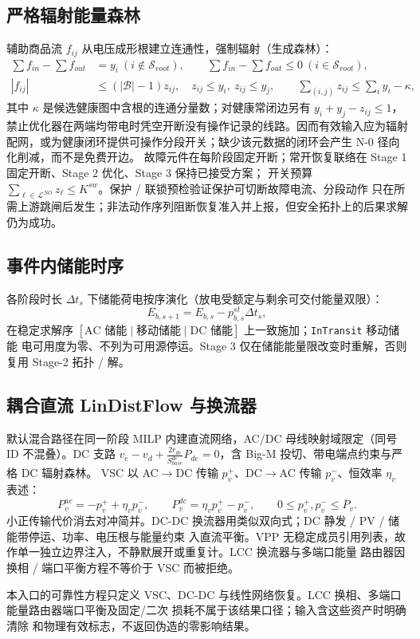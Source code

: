 \subsection{严格辐射能量森林}\label{sec:rel-rs-forest}
辅助商品流 $f_{ij}$ 从电压成形根建立连通性，强制辐射（生成森林）：
\begin{align}
 \sum f_{in}-\sum f_{out}&=y_i\ (i\notin\mathcal S_{root}),\qquad
 \sum f_{in}-\sum f_{out}\le0\ (i\in\mathcal S_{root}),\\
 |f_{ij}|&\le(|\mathcal B|-1)z_{ij},\quad z_{ij}\le y_i,\ z_{ij}\le y_j,\qquad
 \sum_{(i,j)}z_{ij}\le\sum_iy_i-\kappa,
\end{align}
其中 $\kappa$ 是候选健康图中含根的连通分量数；对健康常闭边另有
$y_i+y_j-z_{ij}\le1$，禁止优化器在两端均带电时凭空开断没有操作记录的线路。因而有效输入应为辐射
配网，或为健康闭环提供可操作分段开关；缺少该元数据的闭环会产生 N-0 径向化削减，而不是免费开边。
故障元件在每阶段固定开断；常开恢复联络在 Stage 1 固定开断、Stage 2 优化、Stage 3 保持已接受方案；
开关预算 $\sum_{\ell\in\mathcal L^{NO}}z_\ell\le K^{sw}$。保护 / 联锁预检验证保护可切断故障电流、分段动作
只在所需上游跳闸后发生；非法动作序列阻断恢复准入并上报，但安全拓扑上的后果求解仍为成功。

\subsection{事件内储能时序}\label{sec:rel-rs-storage}
各阶段时长 $\Delta t_s$ 下储能荷电按序演化（放电受额定与剩余可交付能量双限）：
\begin{equation}
 E_{b,s+1}=E_{b,s}-p_{b,s}^{st}\Delta t_s,
\end{equation}
在稳定求解序 $[\text{AC 储能}\mid\text{移动储能}\mid\text{DC 储能}]$ 上一致施加；\texttt{InTransit} 移动储能
电可用度为零、不列为可用源停运。Stage 3 仅在储能能量限改变时重解，否则复用 Stage-2 拓扑 / 解。

\subsection{耦合直流 LinDistFlow 与换流器}\label{sec:rel-rs-dc}
默认混合路径在同一阶段 MILP 内建直流网络，AC/DC 母线映射域限定（同号 ID 不混叠）。DC 支路
$v_e-v_d+\tfrac{2r_{de}}{S_{base}^{dc}}P_{de}=0$，含 Big-M 投切、带电端点约束与严格 DC 辐射森林。
VSC 以 AC$\to$DC 传输 $p_v^+$、DC$\to$AC 传输 $p_v^-$、恒效率 $\eta_v$ 表述：
\begin{equation}
 P_v^{ac}=-p_v^++\eta_vp_v^-,\qquad P_v^{dc}=\eta_vp_v^+-p_v^-,\qquad 0\le p_v^+,p_v^-\le\overline P_v.
\end{equation}
小正传输代价消去对冲简并。DC-DC 换流器用类似双向式；DC 静发 / PV / 储能带停运、功率、电压根与能量约束
入直流平衡。VPP 无稳定成员引用列表，故作单一独立边界注入，不静默展开或重复计。LCC 换流器与多端口能量
路由器因换相 / 端口平衡方程不等价于 VSC 而被拒绝。
\begin{boundarynote}
本入口的可靠性方程只定义 VSC、DC-DC 与线性网络恢复。LCC 换相、多端口能量路由器端口平衡及固定/二次
损耗不属于该结果口径；输入含这些资产时明确清除  和物理有效标志，不返回伪造的零影响结果。
\end{boundarynote}

